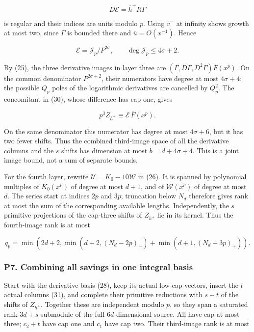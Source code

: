 \documentclass[11pt,a4paper]{article}
\begin{document}
\[
D\mathcal E=\overline h^+R\Gamma
\]

is regular and their indices are units modulo \(p\). Using \(\overline{v}^{-}\) at infinity shows growth at most two, since \(Γ\) is bounded there and \(\overline{u}=O(x^{-1})\). Hence

\[
\mathcal E=\mathcal J_p/P^{2\sigma},\qquad
\deg\mathcal J_p\le4\sigma+2.\tag{33}
\]

By (25), the three derivative images in layer three are \((Γ,DΓ,D^{2}Γ)\overline{F}(x^p)\). On the common denominator \(P^{2σ+2}\), their numerators have degree at most \(4σ+4\): the possible \(Q_p\) poles of the logarithmic derivatives are cancelled by \(Q_p^{2}\). The concomitant in (30), whose difference has cap one, gives

\[
p^3Z_{h^+}\equiv\mathcal E\,\overline F(x^p).
\]

On the same denominator this numerator has degree at most \(4σ+6\), but it has two fewer shifts. Thus the combined third-image space of all the derivative columns and the \(s\) shifts has dimension at most \(b=d+4σ+4\). This is a joint image bound, not a sum of separate bounds.

For the fourth layer, rewrite \(\mathcal{U}=K_{0}-10\mathcal{W}\) in (26). It is spanned by polynomial multiples of \(K_{0}(x^p)\) of degree at most \(d+1\), and of \(\mathcal{W}(x^p)\) of degree at most \(d\). The series start at indices \(2p\) and \(3p\); truncation below \(N_d\) therefore gives rank at most the sum of the corresponding available lengths. Independently, the \(s\) primitive projections of the cap-three shifts of \(Z_{h^{+}}\) lie in its kernel. Thus the fourth-image rank is at most

\[
q_p=\min\left(2d+2,
\min(d+2,(N_d-2p)_+)+\min(d+1,(N_d-3p)_+)\right).\tag{34}
\]

\hypertarget{p7.-combining-all-savings-in-one-integral-basis}{%
\subsubsection{P7. Combining all savings in one integral basis}\label{p7.-combining-all-savings-in-one-integral-basis}}

Start with the derivative basis (28), keep its actual low-cap vectors, insert the \(t\) actual columns (31), and complete their primitive reductions with \(s-t\) of the shifts of \(Z_{h^{+}}\). Together these are independent modulo \(p\), so they span a saturated rank-\(3d+s\) submodule of the full \(6d\)-dimensional source. All have cap at most three; \(c_{2}+t\) have cap one and \(c_{1}\) have cap two. Their third-image rank is at most
\end{document}
